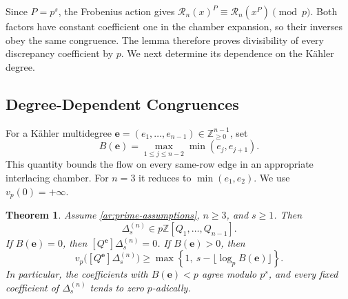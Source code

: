 \documentclass[11pt]{amsart}
\newtheorem{theorem}{Theorem}[section]
\theoremstyle{definition}
\theoremstyle{remark}
\numberwithin{equation}{section}
\newcommand{\Z}{\mathbb Z}
\begin{document}
Since $P=p^s$, the Frobenius action gives
$\mathscr R_n(x)^P\equiv\mathscr R_n(x^P)\pmod p$.
Both factors have constant coefficient one in the chamber
expansion, so their inverses obey the same congruence. The lemma
therefore proves divisibility of every discrepancy coefficient by
$p$. We next determine its dependence on the K\"ahler degree.

\subsection{Degree-Dependent Congruences}
For a K\"ahler multidegree
$\boldsymbol e=(e_1,\ldots,e_{n-1})\in\Z_{\geq0}^{n-1}$, set
\begin{equation}\label{pt:degree-size}
 B(\boldsymbol e)=\max_{1\leq j\leq n-2}\min(e_j,e_{j+1}).
\end{equation}
This quantity bounds the flow on every same-row edge in an
appropriate interlacing chamber. For $n=3$ it reduces to
$\min(e_1,e_2)$. We use $v_p(0)=+\infty$.

\begin{theorem}\label{pt:coefficientwise-bound}
Assume \eqref{ar:prime-assumptions}, $n\geq3$, and $s\geq1$.
Then
\begin{equation}\label{pt:global-congruence}
 \Delta_s^{(n)}\in p\Z[Q_1,\ldots,Q_{n-1}].
\end{equation}
If $B(\boldsymbol e)=0$, then
$[Q^{\boldsymbol e}]\Delta_s^{(n)}=0$. If
$B(\boldsymbol e)>0$, then
\begin{equation}\label{pt:degree-precision}
 v_p\bigl([Q^{\boldsymbol e}]\Delta_s^{(n)}\bigr)
 \geq\max\left\{1,\ s-\lfloor\log_pB(\boldsymbol e)\rfloor\right\}.
\end{equation}
In particular, the coefficients with $B(\boldsymbol e)<p$ agree
modulo $p^s$, and every fixed coefficient of
$\Delta_s^{(n)}$ tends to zero $p$-adically.
\end{theorem}
\end{document}
